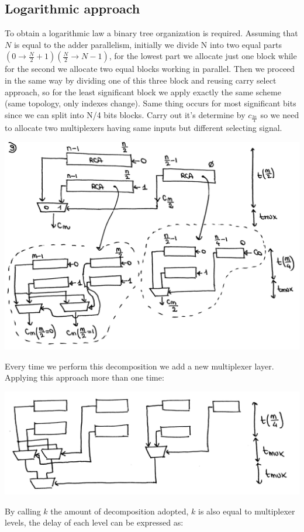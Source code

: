 \subsection{Logarithmic approach}
To obtain a logarithmic law a binary tree organization is required. Assuming
that $N$ is equal to the adder parallelism, initially we divide N into two
equal parts $(0 \rightarrow \frac{N}{2}+1) (\frac{N}{2} \rightarrow N-1)$,
for the lowest part we allocate just one block while for the second we allocate
two equal blocks working in parallel. Then we proceed in the same way by
dividing one of this three block and reusing carry select approach, so for the
least significant block we apply exactly the same scheme (same topology, only
indexes change). Same thing occurs for most significant bits since we can split
into N/4 bits blocks. Carry out it's determine by $c_{\frac{3n}{4}}$ so we need
to allocate two multiplexers having same inputs but different selecting signal.

\begin{center}
  \includegraphics[width=0.7\linewidth]{img/img2/9}
\end{center}


Every time we perform this decomposition we add a new multiplexer layer.
Applying this approach more than one time:

\begin{center}
  \includegraphics[width=0.7\linewidth]{img/img2/10}
\end{center}


By calling $k$ the amount of decomposition adopted, $k$ is also equal to
multiplexer levels, the delay of each level can be expressed as:

